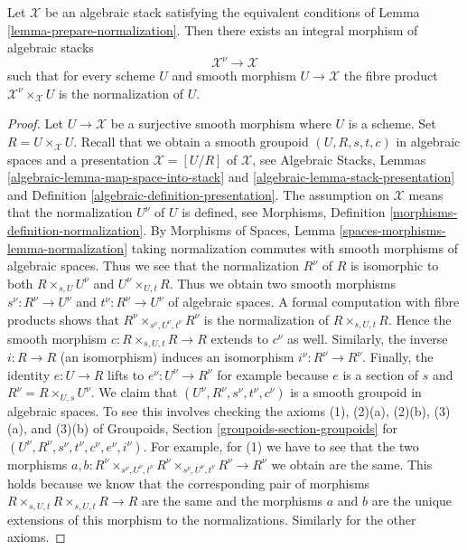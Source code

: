 \begin{lemma}
\label{lemma-normalization}
Let $\mathcal{X}$ be an algebraic stack satisfying
the equivalent conditions of Lemma \ref{lemma-prepare-normalization}.
Then there exists an integral morphism of algebraic stacks
$$
\mathcal{X}^\nu \longrightarrow \mathcal{X}
$$
such that for every scheme $U$ and smooth morphism $U \to \mathcal{X}$
the fibre product $\mathcal{X}^\nu \times_\mathcal{X} U$
is the normalization of $U$.
\end{lemma}

\begin{proof}
Let $U \to \mathcal{X}$ be a surjective smooth morphism where $U$ is a scheme.
Set $R = U \times_\mathcal{X} U$. Recall that we obtain a smooth groupoid
$(U, R, s, t, c)$ in algebraic spaces and a presentation
$\mathcal{X} = [U/R]$ of $\mathcal{X}$, see Algebraic Stacks,
Lemmas \ref{algebraic-lemma-map-space-into-stack} and
\ref{algebraic-lemma-stack-presentation} and
Definition \ref{algebraic-definition-presentation}.
The assumption on $\mathcal{X}$ means that the normalization
$U^\nu$ of $U$ is defined, see Morphisms, Definition
\ref{morphisms-definition-normalization}.
By Morphisms of Spaces, Lemma
\ref{spaces-morphisms-lemma-normalization}
taking normalization commutes with smooth morphisms of algebraic spaces.
Thus we see that the normalization $R^\nu$ of $R$
is isomorphic to both $R \times_{s, U} U^\nu$ and $U^\nu \times_{U, t} R$.
Thus we obtain two smooth morphisms
$s^\nu : R^\nu \to U^\nu$ and $t^\nu : R^\nu \to U^\nu$
of algebraic spaces. A formal computation with fibre products shows that
$R^\nu \times_{s^\nu, U^\nu, t^\nu} R^\nu$ is the normalization
of $R \times_{s, U, t} R$. Hence the smooth morphism
$c : R \times_{s, U, t} R \to R$ extends to $c^\nu$ as well.
Similarly, the inverse $i : R \to R$ (an isomorphism) induces
an isomorphism $i^\nu : R^\nu \to R^\nu$. Finally, the identity
$e : U \to R$ lifts to $e^\nu : U^\nu \to R^\nu$ for example
because $e$ is a section of $s$ and $R^\nu = R \times_{U, s} U^\nu$.
We claim that $(U^\nu, R^\nu, s^\nu, t^\nu, c^\nu)$ is
a smooth groupoid in algebraic spaces. To see this involves checking
the axioms (1), (2)(a), (2)(b), (3)(a), and (3)(b) of
Groupoids, Section \ref{groupoids-section-groupoids}
for $(U^\nu, R^\nu, s^\nu, t^\nu, c^\nu, e^\nu, i^\nu)$.
For example, for (1) we have to see that the two morphisms
$a, b : R^\nu \times_{s^\nu, U^\nu, t^\nu} R^\nu
\times_{s^\nu, U^\nu, t^\nu} R^\nu \to R^\nu$ we obtain are the same.
This holds because we know that the corresponding pair of morphisms
$R \times_{s, U, t} R \times_{s, U, t} R \to R$
are the same and the morphisms $a$ and $b$ are the unique extensions
of this morphism to the normalizations. Similarly for the other
axioms.


\end{proof}
